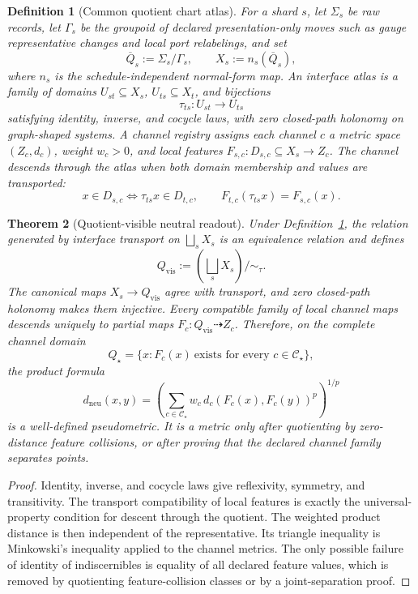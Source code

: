 \documentclass[11pt]{article}
\newtheorem{theorem}{Theorem}[section]
\newtheorem{definition}[theorem]{Definition}
\theoremstyle{remark}
\theoremstyle{plain}
\begin{document}
\begin{definition}[Common quotient chart atlas]\label{def:neutral-quotient-atlas-consensus}
For a shard \(s\), let \(\Sigma_s\) be raw records, let \(\Gamma_s\) be the groupoid of declared
presentation-only moves such as gauge representative changes and local port relabelings, and set
\[
\overline Q_s:=\Sigma_s/\Gamma_s,\qquad X_s:=n_s(\overline Q_s),
\]
where \(n_s\) is the schedule-independent normal-form map. An interface atlas is a family of
domains \(U_{st}\subseteq X_s\), \(U_{ts}\subseteq X_t\), and bijections
\[
\tau_{ts}:U_{st}\to U_{ts}
\]
satisfying identity, inverse, and cocycle laws, with zero closed-path holonomy on graph-shaped
systems. A channel registry assigns each channel \(c\) a metric space \((Z_c,d_c)\), weight
\(w_c>0\), and local features \(F_{s,c}:D_{s,c}\subseteq X_s\to Z_c\). The channel descends
through the atlas when both domain membership and values are transported:
\[
x\in D_{s,c}\Longleftrightarrow \tau_{ts}x\in D_{t,c},
\qquad
F_{t,c}(\tau_{ts}x)=F_{s,c}(x).
\]
\end{definition}

\begin{theorem}[Quotient-visible neutral readout]\label{thm:neutral-quotient-readout-consensus}
Under Definition~\ref{def:neutral-quotient-atlas-consensus}, the relation generated by interface
transport on \(\bigsqcup_sX_s\) is an equivalence relation and defines
\[
Q_{\mathrm{vis}}:=\left(\bigsqcup_sX_s\right)/\!\sim_\tau .
\]
The canonical maps \(X_s\to Q_{\mathrm{vis}}\) agree with transport, and zero closed-path
holonomy makes them injective. Every compatible family of local channel maps descends uniquely
to partial maps \(F_c:Q_{\mathrm{vis}}\dashrightarrow Z_c\). Therefore, on the complete channel
domain
\[
Q_\star=\{x:F_c(x)\ \text{exists for every }c\in\mathcal C_\star\},
\]
the product formula
\[
d_{\mathrm{neu}}(x,y)
=
\left(\sum_{c\in\mathcal C_\star}w_c\,d_c(F_c(x),F_c(y))^p\right)^{1/p}
\]
is a well-defined pseudometric. It is a metric only after quotienting by zero-distance feature
collisions, or after proving that the declared channel family separates points.
\end{theorem}

\begin{proof}
Identity, inverse, and cocycle laws give reflexivity, symmetry, and transitivity. The transport
compatibility of local features is exactly the universal-property condition for descent through
the quotient. The weighted product distance is then independent of the representative. Its
triangle inequality is Minkowski's inequality applied to the channel metrics. The only possible
failure of identity of indiscernibles is equality of all declared feature values, which is
removed by quotienting feature-collision classes or by a joint-separation proof.
\end{proof}
\end{document}
